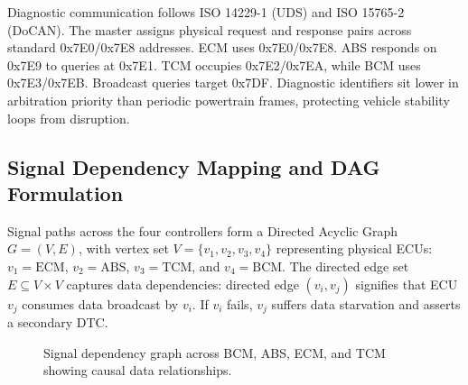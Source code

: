 \documentclass[conference]{IEEEtran}
\begin{document}
Diagnostic communication follows ISO 14229-1 (UDS) and ISO 15765-2 (DoCAN). The master assigns physical request and response pairs across standard 0x7E0/0x7E8 addresses. ECM uses 0x7E0/0x7E8. ABS responds on 0x7E9 to queries at 0x7E1. TCM occupies 0x7E2/0x7EA, while BCM uses 0x7E3/0x7EB. Broadcast queries target 0x7DF. Diagnostic identifiers sit lower in arbitration priority than periodic powertrain frames, protecting vehicle stability loops from disruption.

\subsection{Signal Dependency Mapping and DAG Formulation}
Signal paths across the four controllers form a Directed Acyclic Graph $G = (V, E)$, with vertex set $V = \{v_1, v_2, v_3, v_4\}$ representing physical ECUs: $v_1 = \text{ECM}$, $v_2 = \text{ABS}$, $v_3 = \text{TCM}$, and $v_4 = \text{BCM}$. The directed edge set $E \subseteq V \times V$ captures data dependencies: directed edge $(v_i, v_j)$ signifies that ECU $v_j$ consumes data broadcast by $v_i$. If $v_i$ fails, $v_j$ suffers data starvation and asserts a secondary DTC.

\begin{figure}[t]
\centering
{}
\caption{Signal dependency graph across BCM, ABS, ECM, and TCM showing causal data relationships.}
\label{fig:dag_model}
\end{figure}
\end{document}
